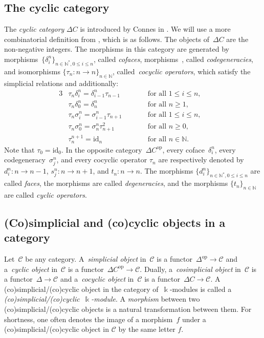 \documentclass[pdftex]{sigma}
\numberwithin{equation}{section}
\newcommand{\co}{\colon}
\newcommand{\id}{\mathrm{id}}
\newcommand{\mc}{\mathcal}
\newcommand{\opp}{\mathrm{op}}
\newcommand{\N}{\mathbb{N}}
\newcommand{\kk}{\Bbbk}
\newlength{\gnat}
\begin{document}
\subsection{The cyclic category}
The \emph{cyclic category} $\Delta C$ is introduced by Connes in \cite{Connesext}. We will use a more combinatorial definition from \cite[Section~6.1]{loday98}, which is as follows. The objects of~$\Delta C$ are the non-negative integers.
The morphisms in this category are generated by morphisms~$\{\delta_i^n\}_{n\in \N^*, 0\le i \le n}$, called \textit{cofaces}, morphisms~\smash{$\bigl\{\sigma_j^n\bigr\}_{n\in \N, 0\le j \le n}$}, called \textit{codegeneracies}, and isomorphisms $\{\tau_n\co n \to n\}_{n\in \N}$, called~\emph{cocyclic operators}, which satisfy the simplicial relations and additionally:
\begin{alignat}{3}
\label{compcoccof}
&\tau_n \delta_i^n = \delta_{i-1}^n \tau_{n-1} \qquad&& \text{for all } 1 \leq i \leq n,& \\
\label{tndelta0}
&\tau_n\delta_0^n=\delta_n^n \qquad &&\text{for all } n\ge 1,& \\
\label{compcoccod}
&\tau_n\sigma_i^n=\sigma_{i-1}^n\tau_{n+1} \qquad &&\text{for all } 1 \leq i \leq n,&\\
\label{tnsigma0}
&\tau_n\sigma_0^n=\sigma_n^n\tau_{n+1}^2 \qquad&& \text{for all } n\ge 0,&\\
\label{cocyclicity}
&\tau_n ^{n+1} = \id_{n} \qquad&& \text{for all } n \in \N.&
\end{alignat}
Note that $\tau_0=\id_{0}$.
In the op\-po\-site ca\-te\-go\-ry~$\Delta C^{\opp}$, every co\-face~$\delta_i^n$, every co\-de\-ge\-ne\-ra\-cy~$\sigma_j^n$, and every cocyclic operator $\tau_n$ are re\-spec\-tively de\-noted by $d_i^n \co n \to n-1$, $s_j^n \co n \to n+1$, and $t_n \co n \to n$.
The morphisms $\{d_i^n\}_{n\in \N^*, 0\le i \le n}$ are called \textit{faces}, the morphisms \smash{$\big\{s_j^n\big\}_{n\in \N, 0 \le j \le n}$} are called \textit{degeneracies}, and the morphisms $\{t_n\}_{n\in \N}$ are called \textit{cyclic operators}.



\subsection{(Co)simplicial and (co)cyclic objects in a category} \label{simpcyc}
Let~$\mc C$ be any category.
A~\textit{simplicial object} in~$\mc C$ is a functor~$\Delta^\opp \to \mc C$ and a~\emph{cyclic object} in~$\mc C$ is a functor~$\Delta C^{\opp} \to \mc C$.
Dually, a~\emph{cosimplicial object} in~$\mc{C}$ is a functor~$\Delta \to \mc C$ and a~\emph{cocyclic object} in~$\mc C$ is a functor~$\Delta C \to \mc C$. A (co)simplicial/(co)cyclic object in the category of~$\kk$-modules is called a \textit{(co)simplicial/(co)cyclic~$\kk$-module}.
A \textit{morphism} between two (co)simplicial/(co)cyclic objects is a natu\-ral transformation between them.
For shortness, one often denotes the image of a morphism~$f$ under a (co)simplicial/(co)cyclic object in $\mc C$ by the same letter $f$.
\end{document}
